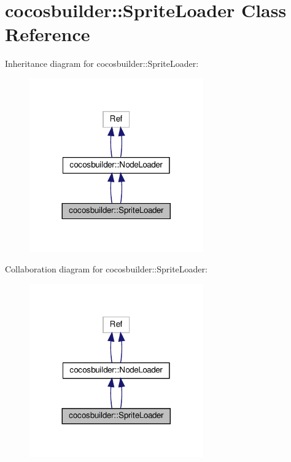 \hypertarget{classcocosbuilder_1_1SpriteLoader}{}\section{cocosbuilder\+:\+:Sprite\+Loader Class Reference}
\label{classcocosbuilder_1_1SpriteLoader}


Inheritance diagram for cocosbuilder\+:\+:Sprite\+Loader\+:
\nopagebreak
\begin{figure}[H]
\begin{center}
\leavevmode
\includegraphics[width=212pt]{classcocosbuilder_1_1SpriteLoader__inherit__graph}
\end{center}
\end{figure}


Collaboration diagram for cocosbuilder\+:\+:Sprite\+Loader\+:
\nopagebreak
\begin{figure}[H]
\begin{center}
\leavevmode
\includegraphics[width=212pt]{classcocosbuilder_1_1SpriteLoader__coll__graph}
\end{center}
\end{figure}
